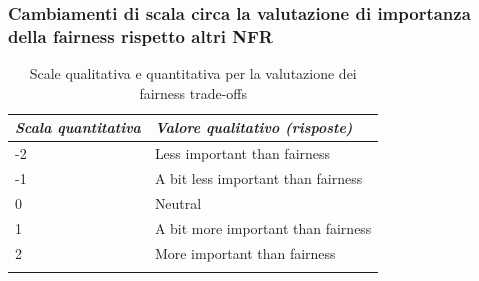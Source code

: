 \subsubsection{Cambiamenti di scala circa la valutazione di importanza della fairness rispetto altri NFR}
    
    \begin{center}
		\hspace*{-5mm}%
	\end{center}
	
     \begin{longtable}{| p{} | p{} |} 
      
      \hline\textbf{\textit{Scala quantitativa}} & \textbf{\textit{Valore qualitativo (risposte)}}
       
        
        \\ \hline
        \rowcolor{Gray}
        -2    
        
        &  Less important than fairness


        \\ \hline


        -1     
        
        & A bit less important than fairness

        \\ \hline
        \rowcolor{Gray}
        0    
        
        &  Neutral

        \\ \hline


        1    
        
        & A bit more important than fairness





        \\ \hline
        
        \rowcolor{Gray}
        2
        
        &  More important than fairness



        \\ \hline
        \caption{Scale qualitativa e quantitativa per la valutazione dei fairness trade-offs} %
        \label{tab:myfirstlongtable}
    \end{longtable}
    
